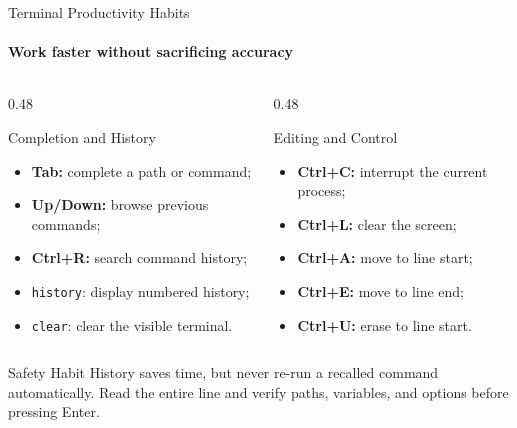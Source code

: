 \begin{frame}{Terminal Productivity Habits}
\framesubtitle{Work faster without sacrificing accuracy}

\footnotesize

\begin{columns}[T,onlytextwidth]
    \begin{column}{0.48\textwidth}
        \begin{block}{Completion and History}
            \begin{itemize}
                \setlength{\itemsep}{0.22em}
                \item \textbf{Tab:} complete a path or command;
                \item \textbf{Up/Down:} browse previous commands;
                \item \textbf{Ctrl+R:} search command history;
                \item \texttt{history}: display numbered history;
                \item \texttt{clear}: clear the visible terminal.
            \end{itemize}
        \end{block}
    \end{column}

    \begin{column}{0.48\textwidth}
        \begin{exampleblock}{Editing and Control}
            \begin{itemize}
                \setlength{\itemsep}{0.22em}
                \item \textbf{Ctrl+C:} interrupt the current process;
                \item \textbf{Ctrl+L:} clear the screen;
                \item \textbf{Ctrl+A:} move to line start;
                \item \textbf{Ctrl+E:} move to line end;
                \item \textbf{Ctrl+U:} erase to line start.
            \end{itemize}
        \end{exampleblock}
    \end{column}
\end{columns}

\begin{alertblock}{Safety Habit}
History saves time, but never re-run a recalled command automatically. Read the
entire line and verify paths, variables, and options before pressing Enter.
\end{alertblock}
\end{frame}

